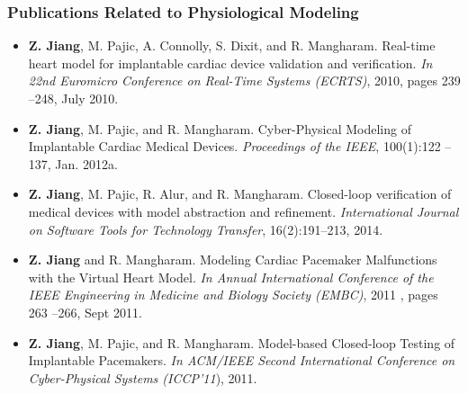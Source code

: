 \documentclass[a4paper,11pt]{article}
\begin{document}
\subsubsection{Publications Related to Physiological Modeling} 
\begin{itemize}
\item \textbf{Z. Jiang}, M. Pajic, A. Connolly, S. Dixit, and R. Mangharam. Real-time heart model for implantable cardiac device validation and verification. \emph{In 22nd Euromicro Conference on Real-Time Systems (ECRTS)}, 2010, pages 239 –248, July 2010.
\item \textbf{Z. Jiang}, M. Pajic, and R. Mangharam. Cyber-Physical Modeling of Implantable Cardiac Medical Devices. \emph{Proceedings of the IEEE}, 100(1):122 –137, Jan. 2012a.
\item \textbf{Z. Jiang}, M. Pajic, R. Alur, and R. Mangharam. Closed-loop verification of medical devices with model abstraction and refinement.\emph{ International Journal on Software Tools for Technology Transfer}, 16(2):191–213, 2014.
\item \textbf{Z. Jiang} and R. Mangharam. Modeling Cardiac Pacemaker Malfunctions with the Virtual Heart Model. \emph{In Annual International Conference of the IEEE Engineering in Medicine and Biology Society (EMBC)}, 2011 , pages 263 –266, Sept 2011.
\item \textbf{Z. Jiang}, M. Pajic, and R. Mangharam. Model-based Closed-loop Testing of Implantable Pacemakers. \emph{In ACM/IEEE Second International Conference on Cyber-Physical Systems (ICCP’11}), 2011.
\end{itemize}
\end{document}
